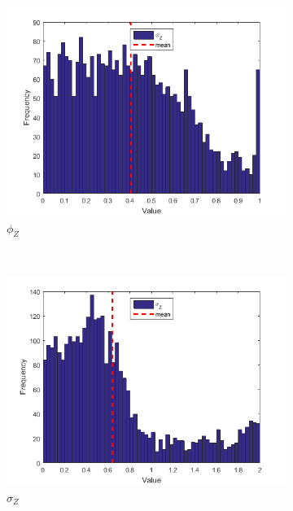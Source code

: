 \documentclass[11pt,a4,twosided,singlespacing,titlepagenumber=on]{scrreprt}
\numberwithin{equation}{chapter} %
\theoremstyle{remark}
\begin{document}
\begin{figure}[H]
\begin{subfigure}[t]{0.32\textwidth}
        \includegraphics[width=1\textwidth]{res/params/2923_3653/3}
        \caption{$\phi_Z$}
    \end{subfigure} \\
    \begin{subfigure}[t]{0.32\textwidth}
        \centering
        \includegraphics[width=1\textwidth]{res/params/2923_3653/4}
        \caption{$\sigma_Z$}
    \end{subfigure}
    \begin{subfigure}[t]{0.32\textwidth}
        \centering

\end{subfigure}
\end{figure}
\end{document}

